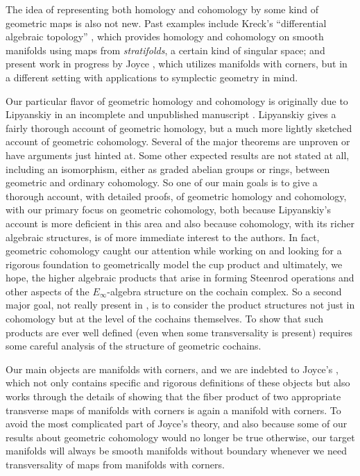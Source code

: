 The idea of representing both homology and cohomology by some kind of geometric maps is also not new.
Past examples include
Kreck's ``differential algebraic topology'' \cite{Krec10}, which provides homology and cohomology on smooth manifolds using maps from \textit{stratifolds}, a certain kind of singular space; and present work in progress by Joyce \cite{Joyc15}, which utilizes manifolds with corners, but in a different setting with applications to symplectic geometry in mind.

Our particular flavor of geometric homology and cohomology is originally due to Lipyanskiy in an incomplete and unpublished manuscript \cite{Lipy14}.
Lipyanskiy gives a fairly thorough account of geometric homology, but a much more lightly sketched account of geometric cohomology.
Several of the major theorems are unproven or have arguments just hinted at.
Some other expected results are not stated at all, including an isomorphism, either as graded abelian groups or rings, between geometric and ordinary cohomology.
So one of our main goals is to give a thorough account, with detailed proofs, of geometric homology and cohomology, with our primary focus on geometric cohomology, both because Lipyanskiy's account is more deficient in this area and also because cohomology, with its richer algebraic structures, is of more immediate interest to the authors.
In fact, geometric cohomology caught our attention while working on \cite{FMS-flows} and looking for a rigorous foundation to geometrically model the cup product and ultimately, we hope, the higher algebraic products that arise in forming Steenrod operations and other aspects of the $E_\infty$-algebra structure on the cochain complex.
So a second major goal, not really present in \cite{Lipy14}, is to consider the product structures not just in cohomology but at the level of the cochains themselves.
To show that such products are ever well defined (even when some transversality is present) requires some careful analysis of the structure of geometric cochains.

Our main objects are manifolds with corners, and we are indebted to Joyce's \cite{Joy12}, which not only contains specific and rigorous definitions of these objects but also works through the details of showing that the fiber product of two appropriate transverse maps of manifolds with corners is again a manifold with corners.
To avoid the most complicated part of Joyce's theory, and also because some of our results about geometric cohomology would no longer be true otherwise,
our target manifolds will always be smooth manifolds without boundary whenever we need transversality of maps from manifolds with corners.

